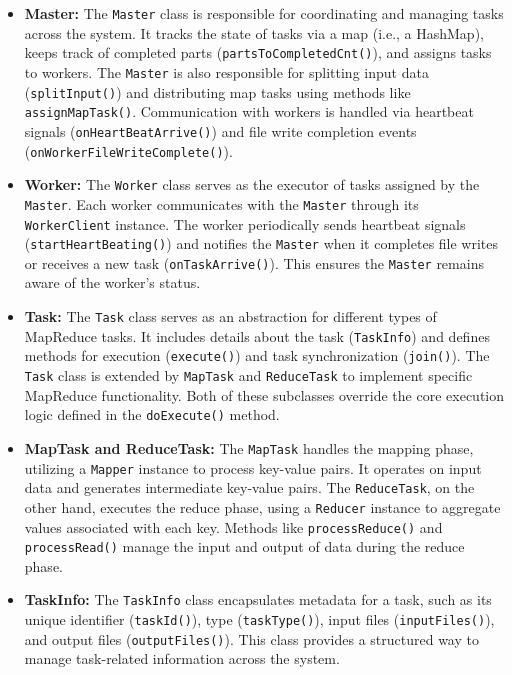\begin{itemize}
    \item \textbf{Master:} The \texttt{Master} class is responsible for coordinating and managing tasks across the system. It tracks the state of tasks via a map (i.e., a HashMap), keeps track of completed parts (\texttt{partsToCompletedCnt()}), and assigns tasks to workers. The \texttt{Master} is also responsible for splitting input data (\texttt{splitInput()}) and distributing map tasks using methods like \texttt{assignMapTask()}. Communication with workers is handled via heartbeat signals (\texttt{onHeartBeatArrive()}) and file write completion events (\texttt{onWorkerFileWriteComplete()}).
    \item \textbf{Worker:} The \texttt{Worker} class serves as the executor of tasks assigned by the \texttt{Master}. Each worker communicates with the \texttt{Master} through its \texttt{WorkerClient} instance. The worker periodically sends heartbeat signals (\texttt{startHeartBeating()}) and notifies the \texttt{Master} when it completes file writes or receives a new task (\texttt{onTaskArrive()}). This ensures the \texttt{Master} remains aware of the worker’s status.
    \item \textbf{Task:} The \texttt{Task} class serves as an abstraction for different types of MapReduce tasks. It includes details about the task (\texttt{TaskInfo}) and defines methods for execution (\texttt{execute()}) and task synchronization (\texttt{join()}). The \texttt{Task} class is extended by \texttt{MapTask} and \texttt{ReduceTask} to implement specific MapReduce functionality. Both of these subclasses override the core execution logic defined in the \texttt{doExecute()} method.
    \item \textbf{MapTask and ReduceTask:} The \texttt{MapTask} handles the mapping phase, utilizing a \texttt{Mapper} instance to process key-value pairs. It operates on input data and generates intermediate key-value pairs. The \texttt{ReduceTask}, on the other hand, executes the reduce phase, using a \texttt{Reducer} instance to aggregate values associated with each key. Methods like \texttt{processReduce()} and \texttt{processRead()} manage the input and output of data during the reduce phase.
    \item \textbf{TaskInfo:} The \texttt{TaskInfo} class encapsulates metadata for a task, such as its unique identifier (\texttt{taskId()}), type (\texttt{taskType()}), input files (\texttt{inputFiles()}), and output files (\texttt{outputFiles()}). This class provides a structured way to manage task-related information across the system.

\end{itemize}
